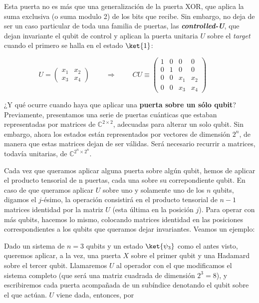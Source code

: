 \documentclass[11pt,a4paper,twoside,pdf]{article}
\numberwithin{equation}{section}
\begin{document}
			Esta puerta no es más que una generalización de la puerta XOR, que aplica la suma exclusiva (o suma modulo 2) de los bits que recibe. Sin embargo, no deja de ser un caso particular de toda una familia de puertas, las \textbf{\textit{controlled-U}}, que dejan invariante el qubit de control y aplican la puerta unitaria $U$ sobre el \textit{target} cuando el primero se halla en el estado $\ket{1}$:
		
				\begin{equation} \label{eq: C-U}
					U = \left(\begin{array}{cc}
					x_1 & x_2 \\
					x_3 & x_4 
					\end{array}\right)											\qquad \;	\Rightarrow 	\;\qquad
					CU \equiv \left(\begin{array}{cccc}
					1 & 0 &   0   &   0		\\
					0 & 1 &   0   &   0	    \\
					0 & 0 & x_1  & x_2 	   \\
					0 & 0 & x_3 & x_4 
					\end{array}\right)							 \qquad 	
				\end{equation}
		
			¿Y qué ocurre cuando haya que aplicar una \textbf{puerta sobre un sólo qubit}? Previamente, presentamos una serie de puertas cuánticas que estaban representadas por matrices de $\mathbb{C}^{2\times 2}$, adecuadas para alterar un solo qubit. Sin embargo, ahora los estados están representados por vectores de dimensión $2^n$, de manera que estas matrices dejan de ser válidas. Será necesario recurrir a matrices, todavía unitarias, de $\mathbb{C}^{2^n\times2^n}$.
		
			Cada vez que queramos aplicar alguna puerta sobre algún qubit, hemos de aplicar el producto tensorial de n puertas, cada una sobre su correpondiente qubit. En caso de que queramos aplicar $U$ sobre uno y solamente uno de los $n$ qubits, digamos el $j$-ésimo, la operación consistirá en el producto tensorial de $n-1$ matrices identidad por la matriz $U$ (esta última en la posición $j$). Para operar con más qubits, hacemos lo mismo, colocando matrices identidad en las posiciones correspondientes a los qubits que queramos dejar invariantes. Veamos un ejemplo: 
		
			Dado un sistema de $n=3$ qubits y un estado $\ket{\psi_3}$ como el antes visto, queremos aplicar, a la vez, una puerta $X$ sobre el primer qubit y una Hadamard sobre el tercer qubit. Llamaremos $U$ al operador con el que modificamos el sistema completo (que será una matriz cuadrada de dimensión $2^3=8$), y escribiremos cada puerta acompañada de un subíndice denotando el qubit sobre el que actúan. $U$ viene dada, entonces, por
		
\end{document}
